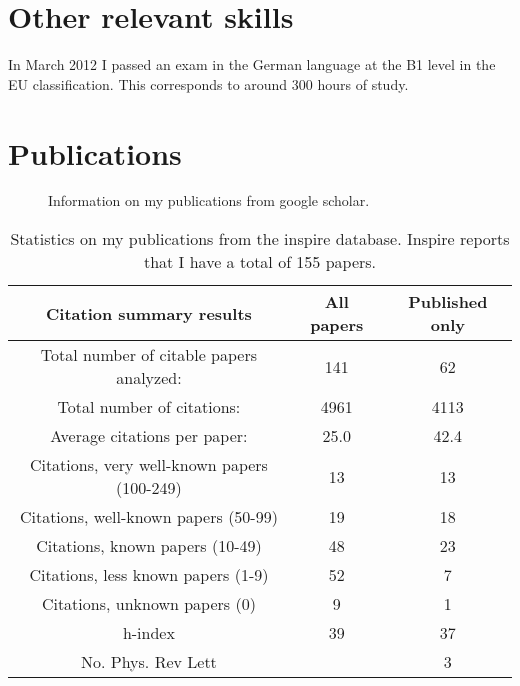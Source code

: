 \documentclass[12pt]{article}
\begin{document}
\section{Other relevant skills}

In March 2012 I passed an exam in the German language
at the B1 level in the EU classification. 
This corresponds to around 300 hours of study.




\section{Publications}

\begin{figure}
\begin{center}
\end{center}
 \caption {
Information on my publications from google scholar.
 }
\label{fig:mefffine}
 \end{figure}

\begin{table}[tb]
\centering
\begin{tabular}{|c|c|c|} \hline
Citation summary results	& All papers	& Published only
\\ \hline
Total number of citable papers analyzed: &	141 &	  62 \\
Total number of citations:  &   4961	 &	4113 \\
Average citations per paper:   & 25.0	&	42.4 \\
Citations, very well-known papers (100-249) &	13 &	13 \\
Citations, well-known papers (50-99)	&	19 &	18 \\
Citations, known papers (10-49)		&	48 &	23 \\
Citations, less known papers (1-9)	&	52 &	7 \\
Citations, unknown papers (0)		&	9  &	1  \\
h-index                                 &     39	&    37 \\
No. Phys. Rev Lett &	    	&    3 \\
\hline
\end{tabular}
\label{tb:fb1summary}
  \caption{
Statistics on my publications from the inspire database. Inspire
reports that I have a total of 155 papers.
}
\end{table}







\end{document}

